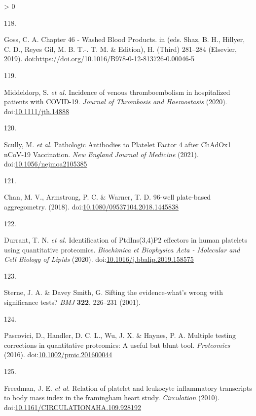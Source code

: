 \documentclass[11pt,twoside]{bristolthesis}
\newlength{\cslhangindent}
\newlength{\csllabelwidth}
\newenvironment{CSLReferences}[2] %
 {%
  \setlength{\parindent}{0pt}
  \ifodd #1 \everypar{\setlength{\hangindent}{\cslhangindent}}\ignorespaces\fi
  \ifnum #2 > 0
  \setlength{\parskip}{#2\baselineskip}
  \fi
 }%
 {}
\newcommand{\CSLLeftMargin}[1]{\parbox[t]{\csllabelwidth}{#1}}
\newcommand{\CSLRightInline}[1]{\parbox[t]{\linewidth - \csllabelwidth}{#1}\break}
\begin{document}
\begin{CSLReferences}{0}{0}
\leavevmode\hypertarget{ref-Goss2019}{}%
\CSLLeftMargin{118. }
\CSLRightInline{Goss, C. A. {Chapter 46 - Washed Blood Products}. in (eds. Shaz, B. H., Hillyer, C. D., Reyes Gil, M. B. T.-. T. M. \& Edition), H. (Third) 281--284 (Elsevier, 2019). doi:\url{https://doi.org/10.1016/B978-0-12-813726-0.00046-5}}

\leavevmode\hypertarget{ref-Middeldorp2020}{}%
\CSLLeftMargin{119. }
\CSLRightInline{Middeldorp, S. \emph{et al.} {Incidence of venous thromboembolism in hospitalized patients with COVID-19}. \emph{Journal of Thrombosis and Haemostasis} (2020). doi:\href{https://doi.org/10.1111/jth.14888}{10.1111/jth.14888}}

\leavevmode\hypertarget{ref-Scully2021}{}%
\CSLLeftMargin{120. }
\CSLRightInline{Scully, M. \emph{et al.} {Pathologic Antibodies to Platelet Factor 4 after ChAdOx1 nCoV-19 Vaccination}. \emph{New England Journal of Medicine} (2021). doi:\href{https://doi.org/10.1056/nejmoa2105385}{10.1056/nejmoa2105385}}

\leavevmode\hypertarget{ref-Chan2018}{}%
\CSLLeftMargin{121. }
\CSLRightInline{Chan, M. V., Armstrong, P. C. \& Warner, T. D. 96-well plate-based aggregometry. (2018). doi:\href{https://doi.org/10.1080/09537104.2018.1445838}{10.1080/09537104.2018.1445838}}

\leavevmode\hypertarget{ref-Durrant2020}{}%
\CSLLeftMargin{122. }
\CSLRightInline{Durrant, T. N. \emph{et al.} {Identification of PtdIns(3,4)P2 effectors in human platelets using quantitative proteomics}. \emph{Biochimica et Biophysica Acta - Molecular and Cell Biology of Lipids} (2020). doi:\href{https://doi.org/10.1016/j.bbalip.2019.158575}{10.1016/j.bbalip.2019.158575}}

\leavevmode\hypertarget{ref-Sterne2001}{}%
\CSLLeftMargin{123. }
\CSLRightInline{Sterne, J. A. \& Davey Smith, G. {Sifting the evidence-what's wrong with significance tests?} \emph{BMJ} \textbf{322}, 226--231 (2001).}

\leavevmode\hypertarget{ref-Pascovici2016}{}%
\CSLLeftMargin{124. }
\CSLRightInline{Pascovici, D., Handler, D. C. L., Wu, J. X. \& Haynes, P. A. {Multiple testing corrections in quantitative proteomics: A useful but blunt tool}. \emph{Proteomics} (2016). doi:\href{https://doi.org/10.1002/pmic.201600044}{10.1002/pmic.201600044}}

\leavevmode\hypertarget{ref-Freedman2010}{}%
\CSLLeftMargin{125. }
\CSLRightInline{Freedman, J. E. \emph{et al.} {Relation of platelet and leukocyte inflammatory transcripts to body mass index in the framingham heart study}. \emph{Circulation} (2010). doi:\href{https://doi.org/10.1161/CIRCULATIONAHA.109.928192}{10.1161/CIRCULATIONAHA.109.928192}}


\end{CSLReferences}
\end{document}
